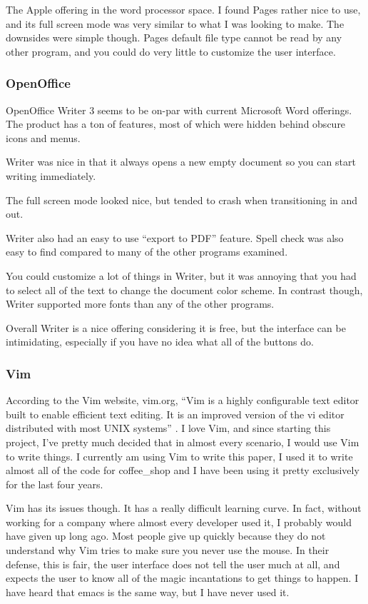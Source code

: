 \documentclass[11pt]{article}
\begin{document}
The Apple offering in the word processor space. I found Pages rather nice to use, and its full screen mode was very similar to what I was looking to make. The downsides were simple though. Pages default file type cannot be read by any other program, and you could do very little to customize the user interface.

\subsubsection{OpenOffice}

OpenOffice Writer 3 seems to be on-par with current Microsoft Word offerings. The product has a ton of features, most of which were hidden behind obscure icons and menus.

Writer was nice in that it always opens a new empty document so you can start writing immediately.

The full screen mode looked nice, but tended to crash when transitioning in and out.

Writer also had an easy to use ``export to PDF'' feature. Spell check was also easy to find compared to many of the other programs examined.

You could customize a lot of things in Writer, but it was annoying that you had to select all of the text to change the document color scheme. In contrast though, Writer supported more fonts than any of the other programs.

Overall Writer is a nice offering considering it is free, but the interface can be intimidating, especially if you have no idea what all of the buttons do.

\subsubsection{Vim}

According to the Vim website, vim.org, ``Vim is a highly configurable text editor built to enable efficient text editing. It is an improved version of the vi editor distributed with most UNIX systems'' \cite{vimabout}. I love Vim, and since starting this project, I've pretty much decided that in almost every scenario, I would use Vim to write things. I currently am using Vim to write this paper, I used it to write almost all of the code for coffee\_shop and I have been using it pretty exclusively for the last four years.

Vim has its issues though. It has a really difficult learning curve. In fact, without working for a company where almost every developer used it, I probably would have given up long ago. Most people give up quickly because they do not understand why Vim tries to make sure you never use the mouse. In their defense, this is fair, the user interface does not tell the user much at all, and expects the user to know all of the magic incantations to get things to happen. I have heard that emacs is the same way, but I have never used it.
\end{document}
